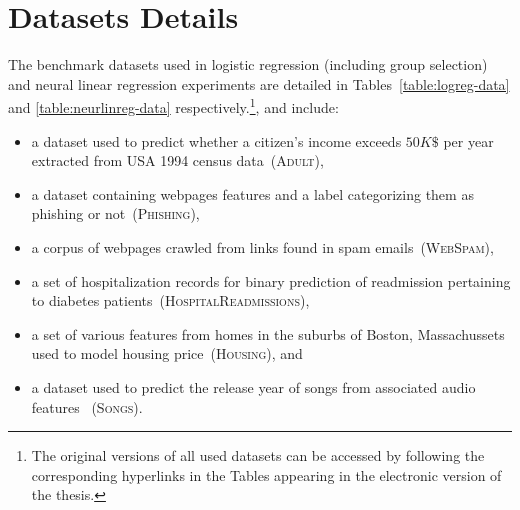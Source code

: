 \section{Datasets Details}
\label{sec:data-details}

The benchmark datasets used in logistic regression (including group selection) and neural linear regression experiments are detailed in Tables~\ref{table:logreg-data} and \ref{table:neurlinreg-data} respectively.\footnote{The original versions of all used datasets can be accessed by following the corresponding hyperlinks in the Tables appearing in the electronic version of the thesis.}, and include: 
\begin{itemize}
	\item a dataset used to predict whether a citizen's income exceeds $50K \$$ per year extracted from USA 1994 census data~(\textsc{Adult}),
	\item a dataset containing webpages features and a label categorizing them as phishing or not~(\textsc{Phishing}),
	\item a corpus of webpages crawled from links found in spam emails~(\textsc{WebSpam}),
	\item a set of hospitalization records for binary prediction of readmission pertaining to diabetes patients~(\textsc{HospitalReadmissions}),
	\item a set of various features from homes in the suburbs of Boston, Massachussets used to model housing price~(\textsc{Housing}), and
	\item a dataset used to predict the release year of songs from associated audio features ~(\textsc{Songs}).
\end{itemize} 

